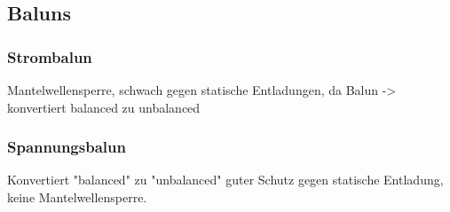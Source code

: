 \subsection{Baluns}

\subsubsection{Strombalun}
Mantelwellensperre, schwach gegen statische Entladungen, da Balun -> konvertiert balanced zu unbalanced 

\subsubsection{Spannungsbalun}
Konvertiert "balanced" zu "unbalanced" guter Schutz gegen statische Entladung, keine Mantelwellensperre.

